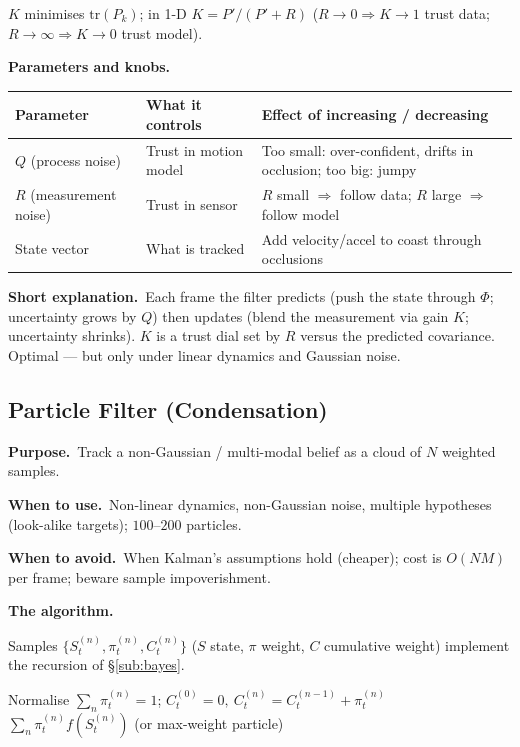 \documentclass[10pt]{article}
\makeatletter
\newcommand{\Purpose}{\par\smallskip\textbf{Purpose.}\ }
\newcommand{\WhenUse}{\par\textbf{When to use.}\ }
\newcommand{\WhenAvoid}{\par\textbf{When to avoid.}\ }
\newcommand{\TheAlgo}{\par\smallskip\textbf{The algorithm.}\par\nopagebreak}
\newcommand{\Knobs}{\par\smallskip\textbf{Parameters and knobs.}\par\nopagebreak}
\newcommand{\ShortExp}{\par\smallskip\textbf{Short explanation.}\ }
\newenvironment{ptable}{\begin{center}\small\begin{tabular}{@{}p{2.5cm} p{5.9cm} p{6.2cm}@{}}\toprule
Parameter & What it controls & Effect of increasing / decreasing \\ \midrule}
{\bottomrule\end{tabular}\end{center}}
\makeatother
\begin{document}
$K$ minimises $\mathrm{tr}(P_k)$; in 1-D $K=P'/(P'+R)$ ($R\to0\Rightarrow K\to1$ trust data;
$R\to\infty\Rightarrow K\to0$ trust model).

\begin{algorithm}[H]
\SetAlgoLined
{}
\caption{Kalman filter}
\end{algorithm}

\Knobs
\begin{ptable}
$Q$ (process noise) & Trust in motion model & Too small: over-confident, drifts in occlusion; too big: jumpy \\
$R$ (measurement noise) & Trust in sensor & $R$ small $\Rightarrow$ follow data; $R$ large $\Rightarrow$ follow model \\
State vector & What is tracked & Add velocity/accel to coast through occlusions \\
\end{ptable}
\ShortExp Each frame the filter predicts (push the state through $\Phi$; uncertainty grows by $Q$) then
updates (blend the measurement via gain $K$; uncertainty shrinks). $K$ is a trust dial set by $R$ versus the
predicted covariance. Optimal --- but only under linear dynamics and Gaussian noise.

\subsection{Particle Filter (Condensation)}\label{sub:particle}
\Purpose Track a non-Gaussian / multi-modal belief as a cloud of $N$ weighted samples.
\WhenUse Non-linear dynamics, non-Gaussian noise, multiple hypotheses (look-alike targets); $100$--$200$
particles.
\WhenAvoid When Kalman's assumptions hold (cheaper); cost is $O(NM)$ per frame; beware sample
impoverishment.
\TheAlgo Samples $\{S_t^{(n)},\pi_t^{(n)},C_t^{(n)}\}$ ($S$ state, $\pi$ weight, $C$ cumulative weight)
implement the recursion of \S\ref{sub:bayes}.

\begin{algorithm}[H]
\SetAlgoLined
{}
Normalise $\sum_n\pi_t^{(n)}=1$; $C_t^{(0)}=0,\ C_t^{(n)}=C_t^{(n-1)}+\pi_t^{(n)}$\;
\Return $\sum_n\pi_t^{(n)}f(S_t^{(n)})$ (or max-weight particle)\;
\caption{Condensation (particle filter)}
\end{algorithm}
\end{document}
